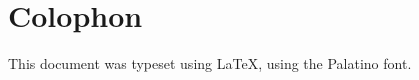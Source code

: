 \thispagestyle{empty}

\hfill{}
\vfill{}

\section*{Colophon}
\noindent This document was typeset using \LaTeX, using the Palatino font.

